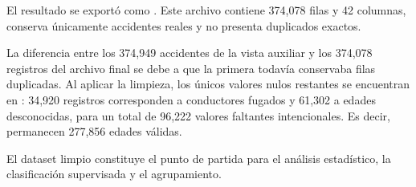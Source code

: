 \documentclass[11pt,letterpaper]{article}
\begin{document}
\begin{nota}
El resultado se exportó como . Este archivo
contiene 374,078 filas y 42 columnas, conserva únicamente accidentes reales y no
presenta duplicados exactos.

\vspace{0.4em}
La diferencia entre los 374,949 accidentes de la vista auxiliar y los 374,078
registros del archivo final se debe a que la primera todavía conservaba filas
duplicadas. Al aplicar la limpieza, los únicos valores nulos restantes se
encuentran en : 34,920 registros corresponden a conductores fugados
y 61,302 a edades desconocidas, para un total de 96,222 valores faltantes
intencionales. Es decir, permanecen 277,856 edades válidas.

\vspace{0.4em}

El dataset limpio constituye el punto de partida para el análisis estadístico,
la clasificación supervisada y el agrupamiento.
\end{nota}
\end{document}

